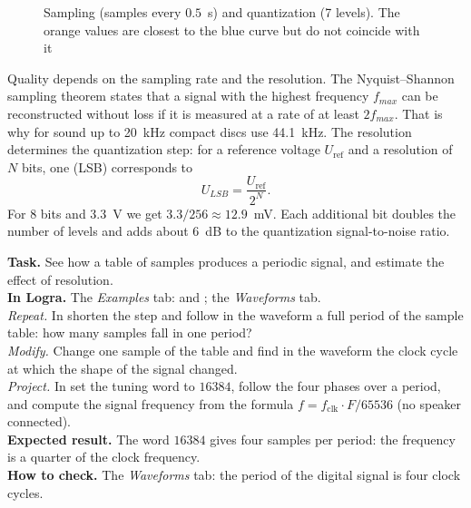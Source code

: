 \begin{figure}[H]
\centering
{}
\caption{Sampling (samples every $0.5$~s) and quantization (7 levels). The orange values are closest to the blue curve but do not coincide with it}
\end{figure}

Quality depends on the sampling rate and the resolution. The
Nyquist--Shannon sampling theorem states that a signal with the highest frequency
$f_{max}$ can be reconstructed without loss if it is measured at a rate
of at least $2 f_{max}$. That is why for sound up to 20~kHz compact discs use
44.1~kHz. The resolution determines the quantization step: for a reference voltage
$U_{\text{ref}}$ and a resolution of $N$ bits, one  (LSB) corresponds to
\[
U_{LSB} = \frac{U_{\text{ref}}}{2^N}.
\]
For 8 bits and 3.3~V we get $3.3/256 \approx 12.9$~mV. Each
additional bit doubles the number of levels and adds about 6~dB to the
quantization signal-to-noise ratio.

\begin{diybox}
\textbf{Task.} See how a table of samples produces a periodic signal, and
estimate the effect of resolution.\\
\textbf{In Logra.} The \emph{Examples} tab:  and
; the \emph{Waveforms} tab.\\
 \emph{Repeat.} In  shorten the step and follow in the
waveform a full period of the sample table: how many samples fall in one
period?\\
 \emph{Modify.} Change one sample of the table and find in the waveform the
clock cycle at which the shape of the signal changed.\\
 \emph{Project.} In  set the tuning word to
$16384$, follow the four phases over a period, and compute the signal frequency from
the formula $f = f_\text{clk}\cdot F/65536$ (no speaker connected).\\
\textbf{Expected result.} The word $16384$ gives four samples per period:
the frequency is a quarter of the clock frequency.\\
\textbf{How to check.} The \emph{Waveforms} tab: the period of the digital signal
is four clock cycles.
\end{diybox}

